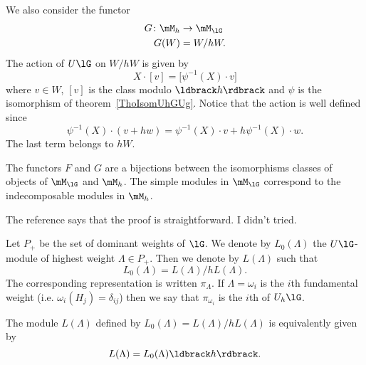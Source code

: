 We also consider the functor
\begin{equation}
	\begin{aligned}
		G\colon \mM_h & \to \mM_{\lG} \\
		G(W)          & = W/hW.
	\end{aligned}
\end{equation}
The action of \( U\lG\) on \( W/hW\) is given by
\begin{equation}
	X\cdot [v]=\big[ \psi^{-1}(X)\cdot v \big]
\end{equation}
where \( v\in W\), \( [v]\) is the class modulo \( \ldbrack h\rdbrack\) and \( \psi\) is the isomorphism of theorem~\ref{ThoIsomUhGUg}. Notice that the action is well defined since
\begin{equation}
	\psi^{-1}(X)\cdot(v+hw)=\psi^{-1}(X)\cdot v+h\psi^{-1}(X)\cdot w.
\end{equation}
The last term belongs to \( hW\).

\begin{proposition}
	The functors \( F\) and \( G\) are a bijections between the isomorphisms classes of objects of \( \mM_{\lG}\) and \( \mM_h\). The simple modules in \( \mM_{\lG}\) correspond to the indecomposable modules in \( \mM_h\).
\end{proposition}
The reference \cite{SoibelmanI} says that the proof is straightforward. I didn't tried.

Let \( P_+\) be the set of dominant weights of \( \lG\). We denote by \( L_0(\Lambda)\) the \( U\lG\)-module of highest weight \( \Lambda\in P_+\). Then we denote by \( L(\Lambda)\) such that
\begin{equation}
	L_0(\Lambda)=L(\Lambda)/hL(\Lambda).
\end{equation}
The corresponding representation is written \( \pi_{\Lambda}\). If \( \Lambda=\omega_i\) is the \( i\)th fundamental weight (i.e. \( \omega_i(H_j)=\delta_{ij}\)) then we say that \( \pi_{\omega_i}\) is the \( i\)th  of \( U_h\lG\).

\begin{lemma}
	The module \( L(\Lambda)\) defined by \( L_0(\Lambda)=L(\Lambda)/hL(\Lambda) \) is equivalently given by
	\begin{equation}
		L(\Lambda)=L_0(\Lambda)\ldbrack h\rdbrack.
	\end{equation}
\end{lemma}

